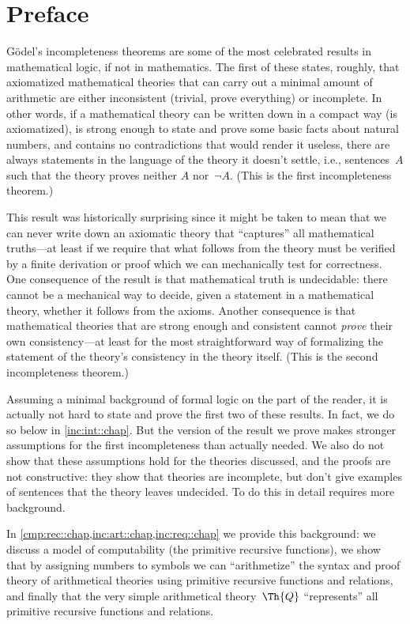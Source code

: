 
\chapter{Preface}

G\"odel's incompleteness theorems are some of the most celebrated
results in mathematical logic, if not in mathematics. The first of
these states, roughly, that axiomatized mathematical theories that can
carry out a minimal amount of arithmetic are either inconsistent
(trivial, prove everything) or incomplete. In other words, if a
mathematical theory can be written down in a compact way (is
axiomatized), is strong enough to state and prove some basic facts
about natural numbers, and contains no contradictions that would
render it useless, there are always statements in the language of the
theory it doesn't settle, i.e., sentences~$A$ such that the theory
proves neither $A$ nor~$\lnot A$. (This is the first incompleteness
theorem.)

This result was historically surprising since it might be
taken to mean that we can never write down an axiomatic theory that
``captures'' all mathematical truths---at least if we require that
what follows from the theory must be verified by a finite derivation
or proof which we can mechanically test for correctness. One
consequence of the result is that mathematical truth is undecidable:
there cannot be a mechanical way to decide, given a statement in a
mathematical theory, whether it follows from the axioms. Another
consequence is that mathematical theories that are strong enough and
consistent cannot \emph{prove} their own consistency---at least for
the most straightforward way of formalizing the statement of the
theory's consistency in the theory itself. (This is the second
incompleteness theorem.)

Assuming a minimal background of formal logic on the part of the
reader, it is actually not hard to state and prove the first two of
these results. In fact, we do so below in \cref{inc:int::chap}. But
the version of the result we prove makes stronger assumptions for the
first incompleteness than actually needed. We also do not show that
these assumptions hold for the theories discussed, and the proofs are
not constructive: they show that theories are incomplete, but don't
give examples of sentences that the theory leaves undecided. To do
this in detail requires more background.

In \cref{cmp:rec::chap,inc:art::chap,inc:req::chap} we provide this
background: we discuss a model of computability (the primitive
recursive functions), we show that by assigning numbers to symbols we
can ``arithmetize'' the syntax and proof theory of arithmetical
theories using primitive recursive functions and relations, and
finally that the very simple arithmetical theory~$\Th{Q}$
``represents'' all primitive recursive functions and relations.

